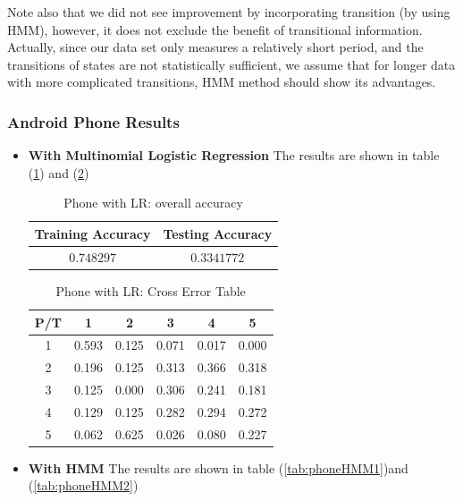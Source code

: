 Note also that we did not see improvement by incorporating transition (by using HMM), however, it does not exclude the benefit of transitional information. Actually, since our data set only measures a relatively short period, and the transitions of states are not statistically sufficient, we assume that for longer data with more complicated transitions, HMM method should show its advantages. 

\subsubsection{Android Phone Results} 
\label{subsec:phoneresult}
\begin{itemize}

\item \textbf{With Multinomial Logistic Regression} 
The results are shown in table (\ref{tab:phoneLR1}) and (\ref{tab:phoneLR2})

\begin{table}[!htb]
\begin{center}
\begin{tabular}{c|c}
      \hline
      Training Accuracy & Testing Accuracy\\
      \hline
      $0.748297$ & $0.3341772$ \\
      \hline
\end{tabular}
\caption{Phone with LR: overall accuracy}
\label{tab:phoneLR1}
\end{center}
\end{table}

\begin{table}[!htb]
\begin{center}
\begin{tabular}{c|c|c|c|c|c}
      \hline
      P/T& 1 & 2 &3 & 4 & 5 \\
      \hline
      1 &0.593&0.125&0.071&0.017&0.000\\
      2 &0.196&0.125&0.313&0.366&0.318\\
      3 &0.125&0.000&0.306&0.241&0.181\\
      4 &0.129&0.125&0.282&0.294&0.272\\
      5 &0.062&0.625&0.026&0.080&0.227\\
      \hline
\end{tabular}
\caption{Phone with LR: Cross Error Table}
\label{tab:phoneLR2}
\end{center}
\end{table}

\item \textbf{With HMM}
The results are shown in table (\ref{tab:phoneHMM1})and (\ref{tab:phoneHMM2})


\end{itemize}
